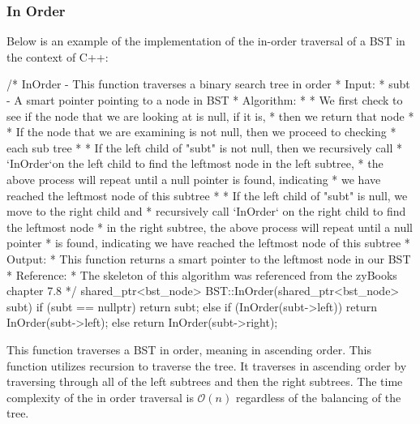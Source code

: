 \begin{highlight}

\subsubsection*{In Order}

Below is an example of the implementation of the in-order traversal of a BST in the context of C++:

\begin{code}
/*  InOrder - This function traverses a binary search tree in order
*   Input:
*     subt - A smart pointer pointing to a node in BST
*   Algorithm:
*     * We first check to see if the node that we are looking at is null, if it is, 
*       then we return that node
*     * If the node that we are examining is not null, then we proceed to checking 
*       each sub tree
*       * If the left child of "subt" is not null, then we recursively call 
*         `InOrder`on the left child to find the leftmost node in the left subtree, 
*         the above process will repeat until a null pointer is found, indicating 
*         we have reached the leftmost node of this subtree
*       * If the left child of "subt" is null, we move to the right child and 
*         recursively call `InOrder` on the right child to find the leftmost node 
*         in the right subtree, the above process will repeat until a null pointer 
*         is found, indicating we have reached the leftmost node of this subtree
*   Output:
*     This function returns a smart pointer to the leftmost node in our BST
*   Reference:
*     The skeleton of this algorithm was referenced from the zyBooks chapter 7.8
*/
shared_ptr<bst_node> BST::InOrder(shared_ptr<bst_node> subt) {
    if (subt == nullptr) {
        return subt;
    }
    else {
        if (InOrder(subt->left)) {
            return InOrder(subt->left);
        }
        else {
            return InOrder(subt->right);
        }
    }
}
\end{code}

\noindent This function traverses a BST in order, meaning in ascending order. This function utilizes recursion to traverse the tree. It traverses in ascending order by traversing through all of the
left subtrees and then the right subtrees. The time complexity of the in order traversal is $\mathcal{O}(n)$ regardless of the balancing of the tree.

\end{highlight}


